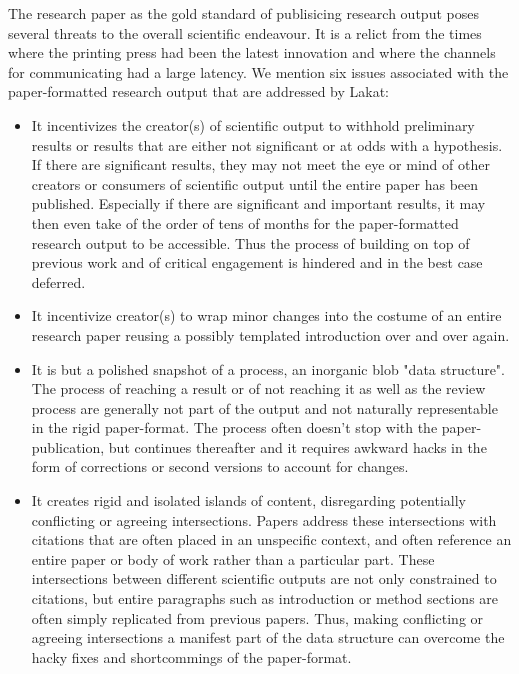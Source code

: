 The research paper as the gold standard of publisicing research output poses several threats to the overall scientific endeavour. It is a relict from the times where the printing press had been the latest innovation and where the channels for communicating had a large latency.  We mention six issues associated with the paper-formatted research output that are addressed by Lakat:
\begin{itemize}

 \item It incentivizes the creator(s) of scientific output to withhold preliminary results or results that are either not significant or at odds with a hypothesis. If there are significant results, they may not meet the eye or mind of other creators or consumers of scientific output until the entire paper has been published. Especially if there are significant and important results, it may then even take of the order of tens of months for the paper-formatted research output to be accessible. Thus the process of building on top of previous work and of critical engagement is hindered and in the best case deferred.
 
\item It incentivize creator(s) to wrap minor changes into the costume of an entire research paper reusing a possibly templated introduction over and over again. 

\item It is but a polished snapshot of a process, an inorganic blob "data structure". The process of reaching a result or of not reaching it as well as the review process are generally not part of the output and not naturally representable in the rigid paper-format. The process often doesn't stop with the paper-publication, but continues thereafter and it requires awkward hacks in the form of corrections or second versions to account for changes.

\item It creates rigid and isolated islands of content, disregarding potentially conflicting or agreeing intersections. Papers address these intersections with citations that are often placed in an unspecific context, and often reference an entire paper or body of work rather than a particular part. These intersections between different scientific outputs are not only constrained to citations, but entire paragraphs such as introduction or method sections are often simply replicated from previous papers. Thus, making conflicting or agreeing intersections a manifest part of the data structure can overcome the hacky fixes and shortcommings of the paper-format.


\end{itemize}
